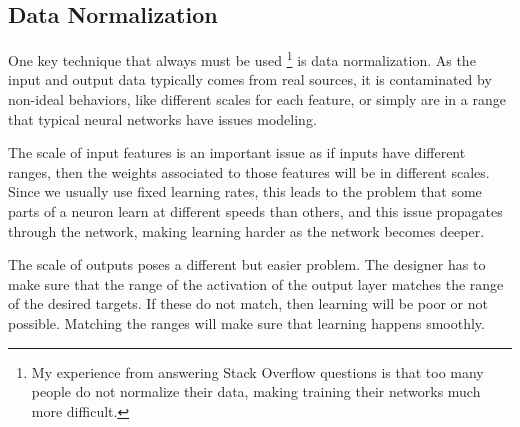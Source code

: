 \subsection{Data Normalization}

One key technique that always must be used \footnote{My experience from answering Stack Overflow questions is that too many people do not normalize their data, making training their networks much more difficult.} is data normalization. As the input and output data typically comes from real sources, it is contaminated by non-ideal behaviors, like different scales for each feature, or simply are in a range that typical neural networks have issues modeling.

The scale of input features is an important issue as if inputs have different ranges, then the weights associated to those features will be in different scales. Since we usually use fixed learning rates, this leads to the problem that some parts of a neuron learn at different speeds than others, and this issue propagates through the network, making learning harder as the network becomes deeper.

The scale of outputs poses a different but easier problem. The designer has to make sure that the range of the activation of the output layer matches the range of the desired targets. If these do not match, then learning will be poor or not possible. Matching the ranges will make sure that learning happens smoothly.

